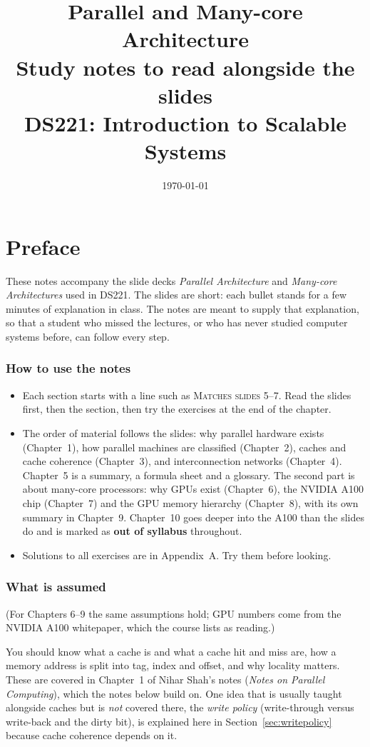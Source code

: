 \documentclass[11pt,a4paper,openany]{book}
\title{\textbf{Parallel and Many-core Architecture}\\[4pt]\Large Study notes to read alongside the slides\\[2pt]\large DS221: Introduction to Scalable Systems}
\author{}
\date{\today}
\begin{document}
\frontmatter
\maketitle

\chapter*{Preface}

These notes accompany the slide decks \emph{Parallel Architecture} and \emph{Many-core Architectures} used in DS221. The slides are
short: each bullet stands for a few minutes of explanation in class. The notes are meant to
supply that explanation, so that a student who missed the lectures, or who has never studied
computer systems before, can follow every step.

\subsection*{How to use the notes}
\begin{itemize}
  \item Each section starts with a line such as \textsc{Matches slides 5--7}. Read the slides
        first, then the section, then try the exercises at the end of the chapter.
  \item The order of material follows the slides: why parallel hardware exists (Chapter~1),
        how parallel machines are classified (Chapter~2), caches and cache coherence
        (Chapter~3), and interconnection networks (Chapter~4). Chapter~5 is a summary, a
        formula sheet and a glossary. The second part is about many-core processors: why GPUs exist (Chapter~6), the
        NVIDIA A100 chip (Chapter~7) and the GPU memory hierarchy (Chapter~8), with its own summary in Chapter~9. Chapter~10 goes deeper into the A100 than the slides do and is marked as \textbf{out of syllabus} throughout.
  \item Solutions to all exercises are in Appendix~A. Try them before looking.
\end{itemize}

\subsection*{What is assumed}
(For Chapters 6--9 the same assumptions hold; GPU numbers come from the NVIDIA A100 whitepaper, which the course lists as reading.)\par\smallskip
You should know what a cache is and what a cache hit and miss are, how a memory address is split
into tag, index and offset, and why locality matters. These are covered in Chapter~1 of Nihar
Shah's notes (\emph{Notes on Parallel Computing}), which the notes below build on. One idea that
is usually taught alongside caches but is \emph{not} covered there, the \emph{write policy}
(write-through versus write-back and the dirty bit), is explained here in
Section~\ref{sec:writepolicy} because cache coherence depends on it.
\end{document}
